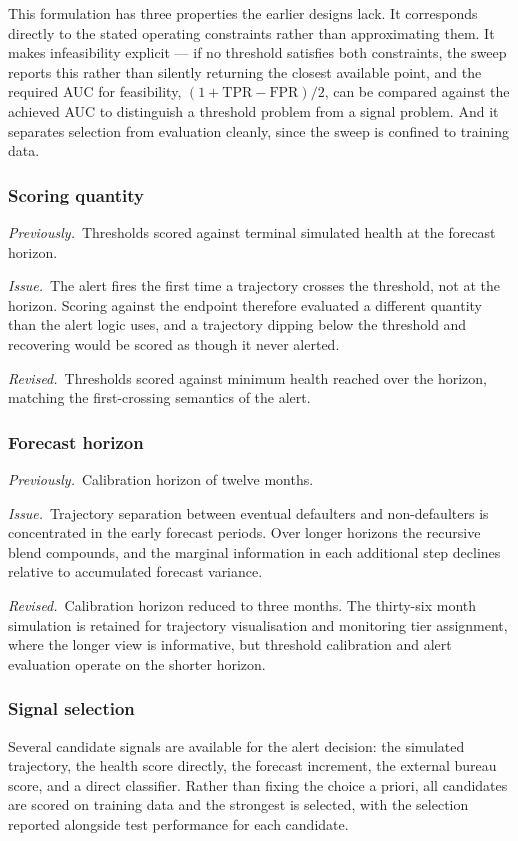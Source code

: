 \documentclass[11pt,a4paper]{article}
\newcommand{\designnote}[3]{%
  \par\vspace{7pt}
  \begin{list}{}{%
    \setlength{\leftmargin}{2em}\setlength{\rightmargin}{1em}%
    \setlength{\labelwidth}{0pt}\setlength{\labelsep}{0pt}%
    \setlength{\itemsep}{2pt}\setlength{\topsep}{0pt}%
    \setlength{\parsep}{0pt}}
    \item[]\textit{Previously.}~#1
    \item[]\textit{Issue.}~#2
    \item[]\textit{Revised.}~#3
  \end{list}
  \par\vspace{7pt}
}
\begin{document}
This formulation has three properties the earlier designs lack. It corresponds directly
to the stated operating constraints rather than approximating them. It makes
infeasibility explicit --- if no threshold satisfies both constraints, the sweep reports
this rather than silently returning the closest available point, and the required AUC for
feasibility, $(1 + \mathrm{TPR} - \mathrm{FPR})/2$, can be compared against the achieved
AUC to distinguish a threshold problem from a signal problem. And it separates selection
from evaluation cleanly, since the sweep is confined to training data.

\subsubsection*{Scoring quantity}

\designnote{Thresholds scored against terminal simulated health at the forecast horizon.}
{The alert fires the first time a trajectory crosses the threshold, not at the horizon.
Scoring against the endpoint therefore evaluated a different quantity than the alert
logic uses, and a trajectory dipping below the threshold and recovering would be scored
as though it never alerted.}
{Thresholds scored against minimum health reached over the horizon, matching the
first-crossing semantics of the alert.}

\subsubsection*{Forecast horizon}

\designnote{Calibration horizon of twelve months.}
{Trajectory separation between eventual defaulters and non-defaulters is concentrated in
the early forecast periods. Over longer horizons the recursive blend compounds, and the
marginal information in each additional step declines relative to accumulated forecast
variance.}
{Calibration horizon reduced to three months. The thirty-six month simulation is retained
for trajectory visualisation and monitoring tier assignment, where the longer view is
informative, but threshold calibration and alert evaluation operate on the shorter
horizon.}

\subsubsection*{Signal selection}

Several candidate signals are available for the alert decision: the simulated trajectory,
the health score directly, the forecast increment, the external bureau score, and a
direct classifier. Rather than fixing the choice a priori, all candidates are scored on
training data and the strongest is selected, with the selection reported alongside test
performance for each candidate.
\end{document}
